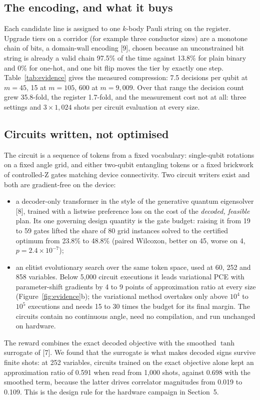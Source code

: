 \documentclass[10pt,a4paper]{article}
\begin{document}
\subsection{The encoding, and what it buys}
Each candidate line is assigned to one $k$-body Pauli string on the register.
Upgrade tiers on a corridor (for example three conductor sizes) are a monotone
chain of bits, a domain-wall encoding [9], chosen because an unconstrained bit
string is already a valid chain 97.5\% of the time against 13.8\% for plain
binary and 0\% for one-hot, and one bit flip moves the tier by exactly one
step. Table~\ref{tab:evidence} gives the measured compression: 7.5 decisions
per qubit at $m=45$, 15 at $m=105$, 600 at $m=9{,}009$. Over that range the
decision count grew 35.8-fold, the register 1.7-fold, and the measurement
cost not at all: three settings and $3\times1{,}024$ shots per circuit
evaluation at every size.

\subsection{Circuits written, not optimised}
The circuit is a sequence of tokens from a fixed vocabulary: single-qubit
rotations on a fixed angle grid, and either two-qubit entangling tokens or a
fixed brickwork of controlled-Z gates matching device connectivity. Two circuit
writers exist and both are gradient-free on the device:
\begin{itemize}
\item a decoder-only transformer in the style of the generative quantum
eigensolver [8], trained with a listwise preference loss on the cost of the
\emph{decoded, feasible} plan. Its one governing design quantity is the gate
budget: raising it from 19 to 59 gates lifted the share of 80 grid instances
solved to the certified optimum from 23.8\% to 48.8\% (paired Wilcoxon, better
on 45, worse on 4, $p=2.4\times10^{-7}$);
\item an elitist evolutionary search over the same token space, used at 60,
252 and 858 variables. Below 5,000 circuit executions it leads variational PCE
with parameter-shift gradients by 4 to 9 points of approximation ratio at
every size (Figure~\ref{fig:evidence}b); the variational method overtakes
only above $10^4$ to $10^5$ executions and needs 15 to 30 times the budget
for its final margin. The circuits contain no continuous
angle, need no compilation, and run unchanged on hardware.
\end{itemize}
The reward combines the exact decoded objective with the smoothed
$\tanh$ surrogate of [7]. We found that the surrogate is what makes decoded
signs survive finite shots: at 252 variables, circuits trained on the exact
objective alone kept an approximation ratio of 0.591 when read from 1,000
shots, against 0.698 with the smoothed term, because the latter drives
correlator magnitudes from 0.019 to 0.109. This is the design rule for the
hardware campaign in Section~5.
\end{document}
